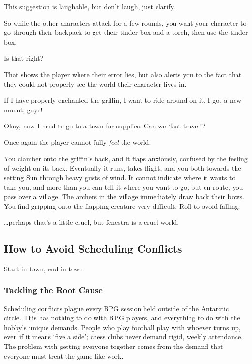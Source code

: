 \begin{multicols}{2}
This suggestion is laughable, but don't laugh, just clarify.

\begin{speechtext}
  So while the other characters attack for a few rounds, you want your character to go through their backpack to get their tinder box and a torch, then use the tinder box.

  Is that right?
\end{speechtext}

That shows the player where their error lies, but also alerts you to the fact that they could not properly see the world their character lives in.

\begin{boxtext}
  If I have properly enchanted the griffin, I want to ride around on it.
  I got a new mount, guys!

  Okay, now I need to go to a town for supplies.
  Can we `fast travel'?
\end{boxtext}

Once again the player cannot fully \emph{feel} the world.

\begin{speechtext}
  You clamber onto the griffin's back, and it flaps anxiously, confused by the feeling of weight on its back.
  Eventually it runs, takes flight, and you both towards the setting Sun through heavy gusts of wind.
  It cannot indicate where it wants to take you, and more than you can tell it where you want to go, but en route, you pass over a village.
  The archers in the village immediately draw back their bows.
  You find gripping onto the flapping creature very difficult.
  Roll  to avoid falling.
  
\end{speechtext}

\noindent
\ldots perhaps that's a little cruel, but \gls{fenestra} is a cruel world.

\subsection{How to Avoid Scheduling Conflicts}

Start in town, end in town.

\subsubsection{Tackling the Root Cause}

Scheduling conflicts plague every RPG session held outside of the Antarctic circle.
This has nothing to do with RPG players, and everything to do with the hobby's unique demands.
People who play football play with whoever turns up, even if it means `five a side'; chess clubs never demand rigid, weekly attendance.
The problem with getting everyone together comes from the demand that everyone must treat the game like work.


\end{multicols}
